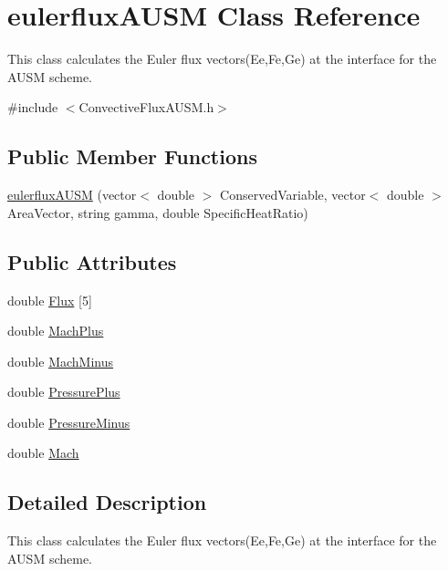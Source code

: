 \hypertarget{classeulerfluxAUSM}{}\section{eulerflux\+A\+U\+SM Class Reference}
\label{classeulerfluxAUSM}


This class calculates the Euler flux vectors(\+Ee,\+Fe,\+Ge) at the interface for the A\+U\+SM scheme.  




{\ttfamily \#include $<$Convective\+Flux\+A\+U\+S\+M.\+h$>$}

\subsection*{Public Member Functions}
\begin{DoxyCompactItemize}
\item 
\hyperlink{classeulerfluxAUSM_a313596688131132478810bf14c0701ae}{eulerflux\+A\+U\+SM} (vector$<$ double $>$ Conserved\+Variable, vector$<$ double $>$ Area\+Vector, string gamma, double Specific\+Heat\+Ratio)
\end{DoxyCompactItemize}
\subsection*{Public Attributes}
\begin{DoxyCompactItemize}
\item 
double \hyperlink{classeulerfluxAUSM_a46908ae326123ac416f7ae023c280060}{Flux} \mbox{[}5\mbox{]}
\item 
double \hyperlink{classeulerfluxAUSM_a9565c076f0be6c66124056ed3fff66b7}{Mach\+Plus}
\item 
double \hyperlink{classeulerfluxAUSM_a8a114564c03cd55a32e0255f9bddbd20}{Mach\+Minus}
\item 
double \hyperlink{classeulerfluxAUSM_abfd3213993dd4b53b12c3f5ecd7046e5}{Pressure\+Plus}
\item 
double \hyperlink{classeulerfluxAUSM_a509830d732c5117ce212397b07e60720}{Pressure\+Minus}
\item 
double \hyperlink{classeulerfluxAUSM_a7c9560ef18e086f6d3cc376c151ad2ff}{Mach}
\end{DoxyCompactItemize}


\subsection{Detailed Description}
This class calculates the Euler flux vectors(\+Ee,\+Fe,\+Ge) at the interface for the A\+U\+SM scheme. 


